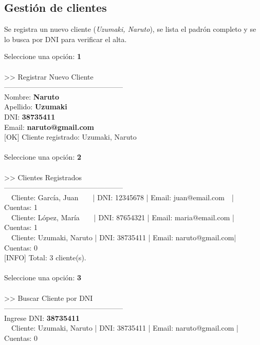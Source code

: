 \documentclass[12pt, a4paper]{article}
\begin{document}
\newpage
\subsection{Gestión de clientes}

Se registra un nuevo cliente (\textit{Uzumaki, Naruto}), se lista el
padrón completo y se lo busca por DNI para verificar el alta.

\begin{tcolorbox}[
  enhanced, breakable,
  colback=black!92!white,
  colframe=black!60!white,
  coltext=green!70!white,
  boxrule=0.5pt,
  arc=4pt,
  fontupper=\ttfamily\small
]
Seleccione una opción: \textbf{1}\\
~\\
\textgreater\textgreater{} Registrar Nuevo Cliente\\
--------------------------------------------------\\
Nombre: \textbf{Naruto}\\
Apellido: \textbf{Uzumaki}\\
DNI: \textbf{38735411}\\
Email: \textbf{naruto@gmail.com}\\
{[OK]} Cliente registrado: Uzumaki, Naruto\\
~\\
Seleccione una opción: \textbf{2}\\
~\\
\textgreater\textgreater{} Clientes Registrados\\
--------------------------------------------------\\
~~Cliente: García, Juan~~~~| DNI: 12345678 | Email: juan@email.com~~| Cuentas: 1\\
~~Cliente: López, María~~~~| DNI: 87654321 | Email: maria@email.com | Cuentas: 1\\
~~Cliente: Uzumaki, Naruto | DNI: 38735411 | Email: naruto@gmail.com| Cuentas: 0\\
{[INFO]} Total: 3 cliente(s).\\
~\\
Seleccione una opción: \textbf{3}\\
~\\
\textgreater\textgreater{} Buscar Cliente por DNI\\
--------------------------------------------------\\
Ingrese DNI: \textbf{38735411}\\
~~Cliente: Uzumaki, Naruto | DNI: 38735411 | Email: naruto@gmail.com | Cuentas: 0
\end{tcolorbox}
\end{document}
